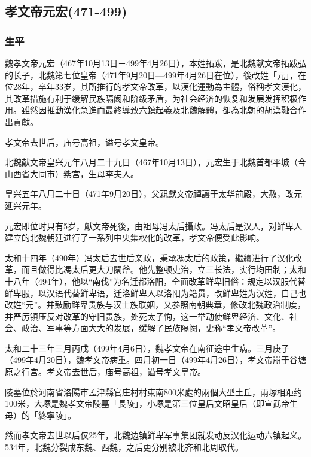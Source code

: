 
\subsection{孝文帝元宏\tiny(471-499)}

\subsubsection{生平}

魏孝文帝元宏（467年10月13日－499年4月26日），本姓拓跋，是北魏献文帝拓跋弘的长子，北魏第七位皇帝（471年9月20日—499年4月26日在位），後改姓「元」，在位28年，卒年33岁，其所推行的孝文帝改革，以漢化運動為主體，俗稱孝文漢化，其改革措施有利于缓解民族隔阂和阶级矛盾，为社会经济的恢复和发展发挥积极作用。雖然因推動漢化急進而最終導致六鎮起義及北魏解體，卻為北朝的胡漢融合作出貢獻。

孝文帝去世后，庙号高祖，谥号孝文皇帝。

北魏献文帝皇兴元年八月二十九日（467年10月13日），元宏生于北魏首都平城（今山西省大同市）紫宫，生母李夫人。

皇兴五年八月二十日（471年9月20日），父親獻文帝禪讓于太华前殿，大赦，改元延兴元年。

元宏即位时只有5岁，獻文帝死後，由祖母冯太后攝政。冯太后是汉人，对鲜卑人建立的北魏朝廷进行了一系列中央集权化的改革，孝文帝便受此影响。

太和十四年（490年）冯太后去世后亲政，秉承馮太后的政策，繼續进行了汉化改革，而且做得比馮太后更大刀闊斧。他先整顿吏治，立三长法，实行均田制；太和十八年（494年），他以“南伐”为名迁都洛阳，全面改革鲜卑旧俗：规定以汉服代替鲜卑服，以汉语代替鲜卑语，迁洛鲜卑人以洛阳为籍贯，改鲜卑姓为汉姓，自己也改姓“元”。并鼓励鲜卑贵族与汉士族联姻，又参照南朝典章，修改北魏政治制度，并严厉镇压反对改革的守旧贵族，处死太子恂，这一举动使鲜卑经济、文化、社会、政治、军事等方面大大的发展，缓解了民族隔阂，史称“孝文帝改革”。

太和二十三年三月丙戌（499年4月6日），魏孝文帝在南征途中生病。三月庚子（499年4月20日），魏孝文帝病重。四月初一日（499年4月26日），孝文帝崩于谷塘原之行宫。孝文帝去世后，庙号高祖，谥号孝文皇帝。

陵墓位於河南省洛陽市孟津縣官庄村村東南800米處的兩個大型土丘，兩塚相距约100米，大塚是魏孝文帝陵墓「長陵」，小塚是第三位皇后文昭皇后（即宣武帝生母）的「終寧陵」。

然而孝文帝去世以后仅25年，北魏边镇鲜卑军事集团就发动反汉化运动六镇起义。534年，北魏分裂成东魏、西魏，之后更分别被北齐和北周取代。

